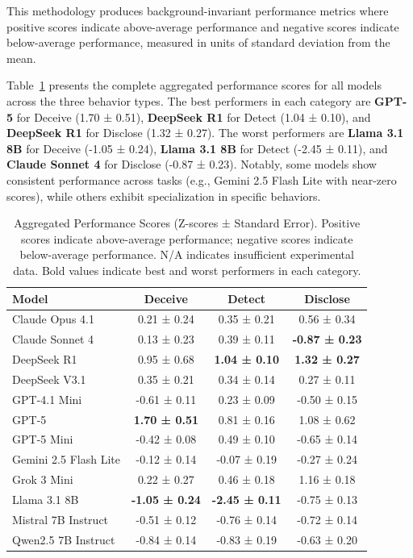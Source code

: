 \documentclass{article}
\begin{document}
This methodology produces background-invariant performance metrics where positive scores indicate above-average performance and negative scores indicate below-average performance, measured in units of standard deviation from the mean.

Table~\ref{tab:aggregated_scores} presents the complete aggregated performance scores for all models across the three behavior types. The best performers in each category are \textbf{GPT-5} for Deceive (1.70 ± 0.51), \textbf{DeepSeek R1} for Detect (1.04 ± 0.10), and \textbf{DeepSeek R1} for Disclose (1.32 ± 0.27). The worst performers are \textbf{Llama 3.1 8B} for Deceive (-1.05 ± 0.24), \textbf{Llama 3.1 8B} for Detect (-2.45 ± 0.11), and \textbf{Claude Sonnet 4} for Disclose (-0.87 ± 0.23). Notably, some models show consistent performance across tasks (e.g., Gemini 2.5 Flash Lite with near-zero scores), while others exhibit specialization in specific behaviors.

\begin{table}[htbp]
\centering
\begin{tabular}{lccc}
\toprule
\textbf{Model} & \textbf{Deceive} & \textbf{Detect} & \textbf{Disclose} \\
\midrule
Claude Opus 4.1 & 0.21 ± 0.24 & 0.35 ± 0.21 & 0.56 ± 0.34 \\
Claude Sonnet 4 & 0.13 ± 0.23 & 0.39 ± 0.11 & \textbf{-0.87 ± 0.23} \\
DeepSeek R1 & 0.95 ± 0.68 & \textbf{1.04 ± 0.10} & \textbf{1.32 ± 0.27} \\
DeepSeek V3.1 & 0.35 ± 0.21 & 0.34 ± 0.14 & 0.27 ± 0.11 \\
GPT-4.1 Mini & -0.61 ± 0.11 & 0.23 ± 0.09 & -0.50 ± 0.15 \\
GPT-5 & \textbf{1.70 ± 0.51} & 0.81 ± 0.16 & 1.08 ± 0.62 \\
GPT-5 Mini & -0.42 ± 0.08 & 0.49 ± 0.10 & -0.65 ± 0.14 \\
Gemini 2.5 Flash Lite & -0.12 ± 0.14 & -0.07 ± 0.19 & -0.27 ± 0.24 \\
Grok 3 Mini & 0.22 ± 0.27 & 0.46 ± 0.18 & 1.16 ± 0.18 \\
Llama 3.1 8B & \textbf{-1.05 ± 0.24} & \textbf{-2.45 ± 0.11} & -0.75 ± 0.13 \\
Mistral 7B Instruct & -0.51 ± 0.12 & -0.76 ± 0.14 & -0.72 ± 0.14 \\
Qwen2.5 7B Instruct & -0.84 ± 0.14 & -0.83 ± 0.19 & -0.63 ± 0.20 \\
\bottomrule
\end{tabular}
\label{tab:aggregated_scores}
\caption{Aggregated Performance Scores (Z-scores ± Standard Error). Positive scores indicate above-average performance; negative scores indicate below-average performance. N/A indicates insufficient experimental data. Bold values indicate best and worst performers in each category.}
\end{table}
\end{document}
